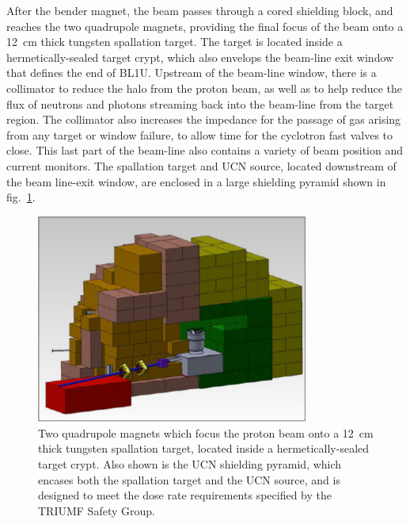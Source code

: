 After the bender magnet, the beam passes through a cored shielding
block, and reaches the two quadrupole magnets, providing the final
focus of the beam onto a 12~cm thick tungsten spallation target.  The
target is located inside a hermetically-sealed target crypt, which
also envelops the beam-line exit window that defines the end of BL1U.
Upstream of the beam-line window, there is a collimator to reduce the
halo from the proton beam, as well as to help reduce the flux of
neutrons and photons streaming back into the beam-line from the target
region. The collimator also increases the impedance for the passage of
gas arising from any target or window failure, to allow time for the
cyclotron fast valves to close. This last part of the beam-line also
contains a variety of beam position and current monitors. The
spallation target and UCN source, located downstream of the beam
line-exit window, are enclosed in a large shielding pyramid shown in
fig.~\ref{fig:pyramid}.
\begin{figure}[h!]
  \centering
  \includegraphics[width=0.8\textwidth]{pyramid.png}
  \caption[Two quadrupole magnets and the shielding pyramid]{Two
    quadrupole magnets which focus the proton beam onto a 12~cm thick
    tungsten spallation target, located inside a hermetically-sealed
    target crypt. Also shown is the UCN shielding pyramid, which
    encases both the spallation target and the UCN source, and is
    designed to meet the dose rate requirements specified by the
    TRIUMF Safety Group.}
  \label{fig:pyramid}
\end{figure}


